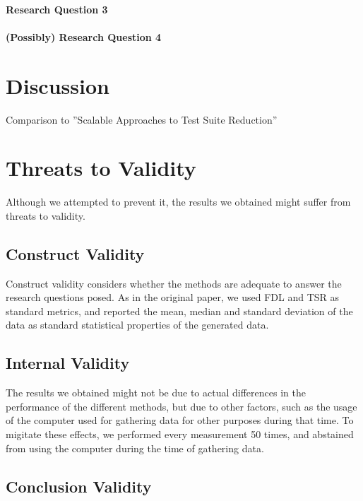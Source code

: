 \paragraph{Research Question 3}

\paragraph{(Possibly) Research Question 4}

\section{Discussion}

Comparison to ''Scalable Approaches to Test Suite Reduction''

\section{Threats to Validity}

Although we attempted to prevent it, the results we obtained might suffer
from threats to validity.

\subsection{Construct Validity}

Construct validity considers whether the methods are adequate to answer
the research questions posed. As in the original paper, we used FDL
and TSR as standard metrics, and reported the mean, median and standard
deviation of the data as standard statistical properties of the generated
data.

\subsection{Internal Validity}

The results we obtained might not be due to actual differences in
the performance of the different methods, but due to other factors,
such as the usage of the computer used for gathering data for other
purposes during that time. To migitate these effects, we performed every
measurement 50 times, and abstained from using the computer during the
time of gathering data.

\subsection{Conclusion Validity}

